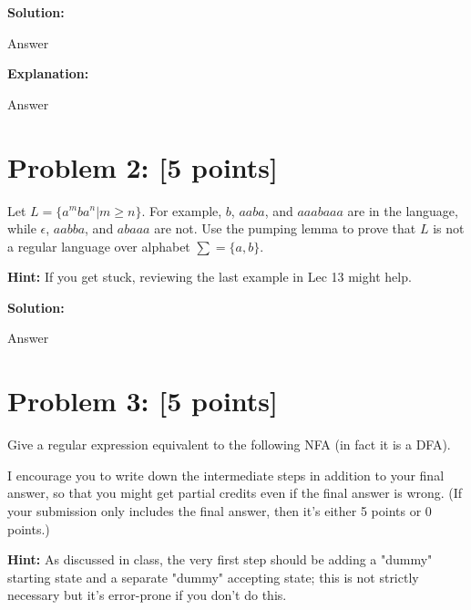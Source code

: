 \documentclass[11pt, letterpaper]{article}
\begin{document}
\noindent\textbf{Solution:}
 
\vspace {5mm}

\noindent Answer

\vspace {5mm}

\noindent \textbf{Explanation:}

\vspace{5mm}

\noindent Answer

\newpage

\section*{Problem 2: [5 points]}

\noindent Let $L = \{a^mba^n | m \geq n\}$. For example, $b$, $aaba$, and $aaabaaa$ are in the language, while $\epsilon$, $aabba$, and $abaaa$ are not. Use the pumping lemma to prove that $L$ is not a regular language over alphabet $\sum = \{a, b\}$.

\vspace{5mm}

\noindent \textbf{Hint:} If you get stuck, reviewing the last example in Lec 13 might help.

\vspace{5mm}

\noindent\textbf{Solution:}

\vspace{5mm}

\noindent Answer

\newpage

\section*{Problem 3: [5 points]}

Give a regular expression equivalent to the following NFA (in fact it is a DFA).

\vspace{5mm}

\noindent I encourage you to write down the intermediate steps in addition to your final answer, so that you might get partial credits even if the final answer is wrong. (If your submission only includes the final answer, then it’s either 5 points or 0 points.)

\vspace{5mm}

\noindent \textbf{Hint:} As discussed in class, the very first step should be adding a "dummy" starting state and a separate "dummy" accepting state; this is not strictly necessary but it's error-prone if you don't do this.
\end{document}
